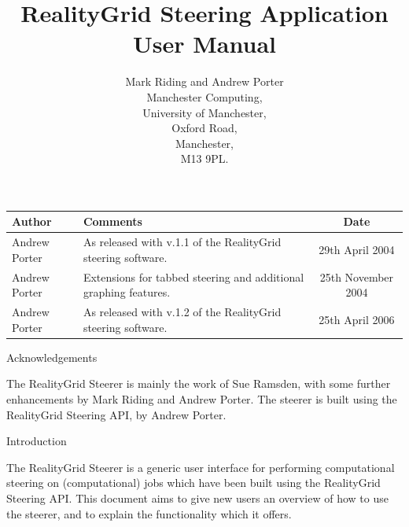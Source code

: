 \documentclass[a4paper,twoside]{article}
\begin{document}
\title{RealityGrid Steering Application User Manual}

\author{Mark Riding and Andrew Porter\\
Manchester Computing,\\University of Manchester,\\Oxford Road,\\
Manchester,\\M13 9PL.}

\maketitle

\begin{table}
\begin{center}
\begin{tabular}{l|p{5cm}|c}
\hline\hline
Author & Comments & Date \\
\hline
Andrew Porter & As released with v.1.1 of the RealityGrid steering software. & 29th April 2004 \\
Andrew Porter & Extensions for tabbed steering and additional graphing features. & 25th November 2004 \\
Andrew Porter & As released with v.1.2 of the RealityGrid steering software. & 25th April 2006\\
\hline\hline
\end{tabular}
\end{center}
\end{table}

\pagebreak

\tableofcontents

\pagebreak

\begin{section}{Acknowledgements}

The RealityGrid Steerer is mainly the work of Sue Ramsden, with some
further enhancements by Mark Riding and Andrew Porter. The steerer is
built using the RealityGrid Steering API, by Andrew Porter.

\end{section}


\begin{section}{Introduction}

The RealityGrid Steerer is a generic user interface for performing
computational steering on (computational) jobs which have been built
using the RealityGrid Steering API. This document aims to give new
users an overview of how to use the steerer, and to explain the
functionality which it offers.

\end{section}
\end{document}
